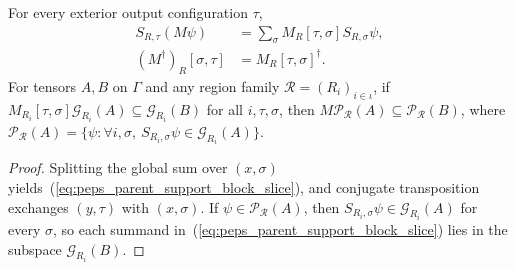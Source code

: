 \begin{lemma}%
    \label{thm:peps_parent_support_block_criterion}
    \leanok
    For every exterior output configuration $\tau$,
    \begin{align}
        S_{R,\tau}(M\psi)
                                   & =\sum_\sigma M_R[\tau,\sigma]S_{R,\sigma}\psi,
        \label{eq:peps_parent_support_block_slice}                                  \\
        (M^\dagger)_R[\sigma,\tau] & =M_R[\tau,\sigma]^\dagger.
    \end{align}
    For tensors $A,B$ on $\Gamma$ and any region family $\mathcal R=(R_i)_{i\in\iota}$,
    if $M_{R_i}[\tau,\sigma]\mathcal G_{R_i}(A)\subseteq\mathcal G_{R_i}(B)$
    for all $i,\tau,\sigma$, then
    $M\mathcal P_{\mathcal R}(A)\subseteq\mathcal P_{\mathcal R}(B)$, where
    $\mathcal P_{\mathcal R}(A)=\{\psi:\forall i,\sigma,\ S_{R_i,\sigma}\psi\in\mathcal G_{R_i}(A)\}$.
\end{lemma}
\begin{proof}\leanok
    Splitting the global sum over $(x,\sigma)$ yields~(\ref{eq:peps_parent_support_block_slice}),
    and conjugate transposition exchanges $(y,\tau)$ with $(x,\sigma)$. If
    $\psi\in\mathcal P_{\mathcal R}(A)$, then $S_{R_i,\sigma}\psi\in\mathcal G_{R_i}(A)$
    for every $\sigma$, so each summand in~(\ref{eq:peps_parent_support_block_slice})
    lies in the subspace $\mathcal G_{R_i}(B)$.
\end{proof}

